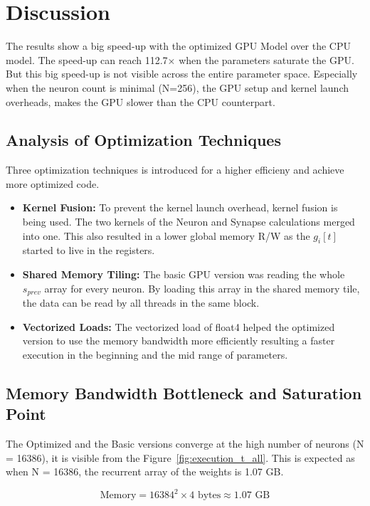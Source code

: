\documentclass[conference]{IEEEtran}
\begin{document}
\section{Discussion}
The results show a big speed-up with the optimized GPU Model over the CPU model.
The speed-up can reach 112.7× when the parameters saturate the GPU.
But this big speed-up is not visible across the entire parameter space. 
Especially when the neuron count is minimal (N=256), the GPU setup and kernel launch overheads, 
makes the GPU slower than the CPU counterpart.

\subsection{Analysis of Optimization Techniques}

Three optimization techniques is introduced for a higher efficieny and achieve more optimized code. 

\begin{itemize}
    \item \textbf{Kernel Fusion:} To prevent the kernel launch overhead, kernel fusion is being used. The two kernels of the Neuron and Synapse calculations merged into one. This also resulted in a lower global memory R/W as the $g_i[t]$ started to live in the registers. 
    \item \textbf{Shared Memory Tiling:} The basic GPU version was reading the whole $s_{prev}$ array for every neuron. By loading this array in the shared memory tile, the data can be read by all threads in the same block.
    \item \textbf{Vectorized Loads:} The vectorized load of float4 helped the optimized version to use the memory bandwidth more efficiently resulting a faster execution in the beginning and the mid range of parameters.
\end{itemize}

\subsection{Memory Bandwidth Bottleneck and Saturation Point}

The Optimized and the Basic versions converge at the high number of neurons (N = 16386), it is visible from the Figure~\ref{fig:execution_t_all}.
This is expected as when N = 16386, the recurrent array of the weights is 1.07 GB. 

$$\text{Memory} = 16384^2 \times 4 \text{ bytes} \approx 1.07 \text{ GB}$$
\end{document}
